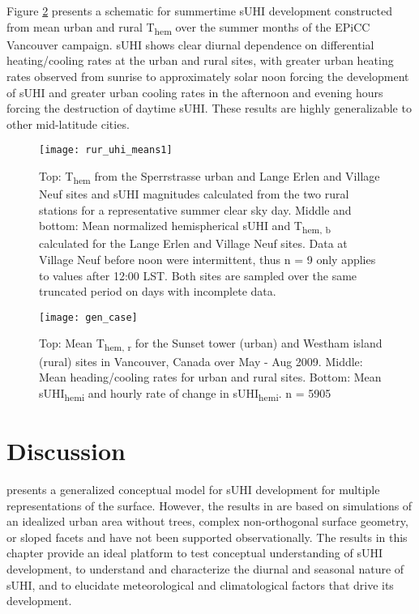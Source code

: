 \begin{bibunit}
Figure \ref{gen_case} presents a schematic for summertime sUHI development constructed from mean urban and rural T\textsubscript{hem} over the summer months of the EPiCC Vancouver campaign. sUHI shows clear diurnal dependence on differential heating/cooling rates at the urban and rural sites, with greater urban heating rates observed from sunrise to approximately solar noon forcing the development of sUHI and greater urban cooling rates in the afternoon and evening hours forcing the destruction of daytime sUHI. These results are highly generalizable to other mid-latitude cities. 

\begin{figure}[H]
	\centering
	\texttt{[image: rur\_uhi\_means1]}
	\caption{Top: T\textsubscript{hem} from the Sperrstrasse urban and Lange Erlen and Village Neuf sites and sUHI magnitudes calculated from the two rural stations for a representative summer clear sky day. Middle and bottom: Mean normalized hemispherical sUHI and T\textsubscript{hem, b} calculated for the Lange Erlen and Village Neuf sites. Data at Village Neuf before noon were intermittent, thus n = 9 only applies to values after 12:00 LST. Both sites are sampled over the same truncated period on days with incomplete data.}
	\label{rur_uhi_means}
\end{figure}

\begin{figure}[H]
	\centering
	\texttt{[image: gen\_case]}
	\caption{Top: Mean T\textsubscript{hem, r} for the Sunset tower (urban) and Westham island (rural) sites in Vancouver, Canada over May - Aug 2009. Middle: Mean heading/cooling rates for urban and rural sites. Bottom: Mean sUHI\textsubscript{hemi} and hourly rate of change in sUHI\textsubscript{hemi}.  n = 5905}
	\label{gen_case}
\end{figure}

\section{Discussion}
\citet{Oke2017} presents a generalized conceptual model for sUHI development for multiple representations of the surface. However, the results in \citet{Oke2017} are based on simulations of an idealized urban area without trees, complex non-orthogonal surface geometry, or sloped facets and have not been supported observationally. The results in this chapter provide an ideal platform to test conceptual understanding of sUHI development, to understand and characterize the diurnal and seasonal nature of sUHI, and to elucidate meteorological and climatological factors that drive its development.


\end{bibunit}
